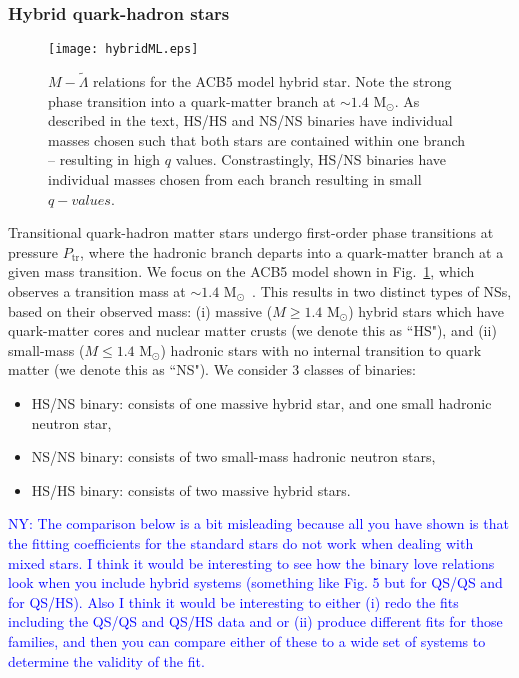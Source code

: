 \documentclass[prd,twocolumn,nofootinbib,superscriptaddress,amsmath,amssymb]{revtex4-1}
\newcommand{\ny}[1]{\textcolor{blue}{NY: #1} }
\begin{document}
\subsubsection{Hybrid quark-hadron stars}\label{sec:hybrid}
\begin{figure}
\begin{center} 
\texttt{[image: hybridML.eps]}
\end{center}
\caption{
$M-\tilde{\Lambda}$ relations for the ACB5 model hybrid star. 
Note the strong phase transition into a quark-matter branch at $\sim 1.4 \text{ M}_{\odot}$.
As described in the text, HS/HS and NS/NS binaries have individual masses chosen such that both stars are contained within one branch -- resulting in high $q$ values.
Constrastingly, HS/NS binaries have individual masses chosen from each branch resulting in small $q-values$.
}
\label{fig:hybridML}
\end{figure} 
Transitional quark-hadron matter stars undergo first-order phase transitions at pressure $P_{\text{tr}}$, where the hadronic branch departs into a quark-matter branch at a given mass transition.
We focus on the ACB5 model shown in Fig.~\ref{fig:hybridML}, which observes a transition mass at $\sim 1.4 \text{ M}_{\odot}$~\cite{Paschalidis2018}.
This results in two distinct types of NSs, based on their observed mass: (i) massive ($M \geq 1.4 \text{ M}_{\odot}$) hybrid stars which have quark-matter cores and nuclear matter crusts (we denote this as ``HS"), and (ii) small-mass ($M \leq 1.4 \text{ M}_{\odot}$) hadronic stars with no internal transition to quark matter (we denote this as ``NS").
We consider 3 classes of binaries:
\begin{itemize}
\item HS/NS binary: consists of one massive hybrid star, and one small hadronic neutron star,
\item NS/NS binary: consists of two small-mass hadronic neutron stars,
\item HS/HS binary: consists of two massive hybrid stars.
\end{itemize}

{\ny{The comparison below is a bit misleading because all you have shown is that the fitting coefficients for the standard stars do not work when dealing with mixed stars. I think it would be interesting to see how the binary love relations look when you include hybrid systems (something like Fig. 5 but for QS/QS and for QS/HS). Also I think it would be interesting to either (i) redo the fits including the QS/QS and QS/HS data and or (ii) produce different fits for those families, and then you can compare either of these to a wide set of systems to determine the validity of the fit.}}
\end{document}
